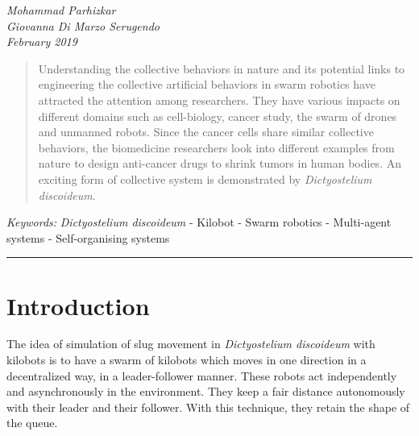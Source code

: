\documentclass[11pt,a4paper]{article}
\begin{document}
\begin{center}
{ }
\vspace{2mm}

{\selectfont\textit{Mohammad Parhizkar \\ Giovanna Di Marzo Serugendo \\ \tiny{February 2019} }}


\end{center}
\begin{abstract}
Understanding the collective behaviors in nature and its potential links to engineering the collective artificial behaviors in swarm robotics have attracted the attention among researchers. They have various impacts on different domains such as cell-biology, cancer study, the swarm of drones and unmanned robots. Since the cancer cells share similar collective behaviors, the biomedicine researchers look into different examples from nature to design anti-cancer drugs to shrink tumors in human bodies. An exciting form of collective system is demonstrated by {\textit{Dictyostelium discoideum}}. 

   \end{abstract}

{\footnotesize\textit{Keywords:} {\textit{Dictyostelium discoideum}} - Kilobot - Swarm robotics - Multi-agent systems - Self-organising systems}

{\begin{center}\noindent\rule{14cm}{0.4pt}\end{center}}
\section{Introduction}
The idea of simulation of slug movement in \textit{Dictyostelium discoideum} with kilobots is to have a swarm of kilobots which moves in one direction in a decentralized way, in a leader-follower manner. These robots act independently and asynchronously in the environment. They keep a fair distance autonomously with their leader and their follower. With this technique, they retain the shape of the queue.  
\end{document}
